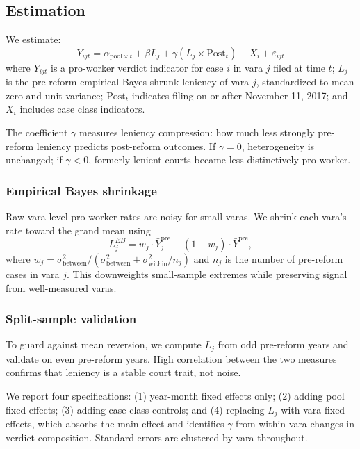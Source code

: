 \documentclass[12pt]{article}
\begin{document}
\subsection{Estimation}

We estimate:
\begin{equation}
Y_{ijt} = \alpha_{\text{pool} \times t} + \beta L_j + \gamma (L_j \times \text{Post}_t) + X_i + \varepsilon_{ijt}
\label{eq:main}
\end{equation}
where $Y_{ijt}$ is a pro-worker verdict indicator for case $i$ in vara $j$ filed at time $t$; $L_j$ is the pre-reform empirical Bayes-shrunk leniency of vara $j$, standardized to mean zero and unit variance; $\text{Post}_t$ indicates filing on or after November 11, 2017; and $X_i$ includes case class indicators.

The coefficient $\gamma$ measures leniency compression: how much less strongly pre-reform leniency predicts post-reform outcomes. If $\gamma = 0$, heterogeneity is unchanged; if $\gamma < 0$, formerly lenient courts became less distinctively pro-worker.

\subsubsection*{Empirical Bayes shrinkage} Raw vara-level pro-worker rates are noisy for small varas. We shrink each vara's rate toward the grand mean using
\[
L_j^{EB} = w_j \cdot \bar{Y}_j^{\text{pre}} + (1 - w_j) \cdot \bar{Y}^{\text{pre}},
\]
where $w_j = \sigma^2_{\text{between}} / (\sigma^2_{\text{between}} + \sigma^2_{\text{within}} / n_j)$ and $n_j$ is the number of pre-reform cases in vara $j$. This downweights small-sample extremes while preserving signal from well-measured varas.

\subsubsection*{Split-sample validation} To guard against mean reversion, we compute $L_j$ from odd pre-reform years and validate on even pre-reform years. High correlation between the two measures confirms that leniency is a stable court trait, not noise.

We report four specifications: (1) year-month fixed effects only; (2) adding pool fixed effects; (3) adding case class controls; and (4) replacing $L_j$ with vara fixed effects, which absorbs the main effect and identifies $\gamma$ from within-vara changes in verdict composition. Standard errors are clustered by vara throughout.
\end{document}
